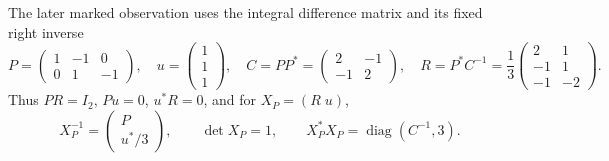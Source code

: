\documentclass[11pt]{article}
\theoremstyle{definition}
\newcommand{\diag}{\operatorname{diag}}
\begin{document}
The later marked observation uses the integral difference matrix and its
fixed right inverse
\begin{equation}
 P=\begin{pmatrix}1&-1&0\\0&1&-1\end{pmatrix},\quad
 u=\begin{pmatrix}1\\1\\1\end{pmatrix},\quad
 C=PP^*=\begin{pmatrix}2&-1\\-1&2\end{pmatrix},\quad
 R=P^*C^{-1}=\frac13
 \begin{pmatrix}2&1\\-1&1\\-1&-2\end{pmatrix}.
 \label{eq:marked-P}
\end{equation}
Thus $PR=I_2$, $Pu=0$, $u^*R=0$, and for $X_P=(R\;u)$,
\begin{equation}
 X_P^{-1}=\begin{pmatrix}P\\u^*/3\end{pmatrix},
 \qquad \det X_P=1,
 \qquad X_P^*X_P=\diag(C^{-1},3).
 \label{eq:marked-inverse}
\end{equation}
\end{document}
